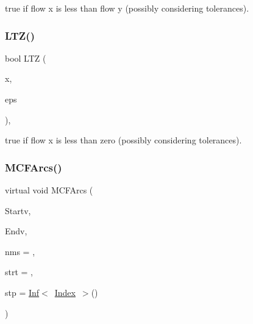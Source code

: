 true if flow x is less than flow y (possibly considering tolerances). \mbox{\label{class_m_c_f_class_ab355a057db64a4b3da5209f747c01eae}} 
\subsubsection{\texorpdfstring{L\+T\+Z()}{LTZ()}}
{\footnotesize\ttfamily bool L\+TZ (\begin{DoxyParamCaption}\item[{T}]{x,  }\item[{const T}]{eps }\end{DoxyParamCaption})\hspace{0.3cm}{\ttfamily [inline]}, {\ttfamily [protected]}}

true if flow x is less than zero (possibly considering tolerances). \mbox{\label{class_m_c_f_class_aa2314bf81483649dd1cb9dada0de6832}} 
\subsubsection{\texorpdfstring{M\+C\+F\+Arcs()}{MCFArcs()}}
{\footnotesize\ttfamily virtual void M\+C\+F\+Arcs (\begin{DoxyParamCaption}\item[{\mbox{\hyperlink{class_m_c_f_class_ace3388eb329ff0551a0b86b6c67e33d8}{Index\+\_\+\+Set}}}]{Startv,  }\item[{\mbox{\hyperlink{class_m_c_f_class_ace3388eb329ff0551a0b86b6c67e33d8}{Index\+\_\+\+Set}}}]{Endv,  }\item[{\mbox{\hyperlink{class_m_c_f_class_a81575b2d4e4d5636b17170432150ae69}{c\+Index\+\_\+\+Set}}}]{nms = {},  }\item[{\mbox{\hyperlink{class_m_c_f_class_a76aaabb20535c51a2752b93f6c38fe54}{c\+Index}}}]{strt = {},  }\item[{\mbox{\hyperlink{class_m_c_f_class_ad53d6229d7ec28555a9c9c2fd9abf773}{Index}}}]{stp = {\ttfamily \mbox{\hyperlink{class_o_p_ttypes__di__unipi__it_1_1_inf}{Inf}}$<$~\mbox{\hyperlink{class_m_c_f_class_ad53d6229d7ec28555a9c9c2fd9abf773}{Index}}~$>$()} }\end{DoxyParamCaption})\hspace{0.3cm}{\ttfamily [pure virtual]}}


